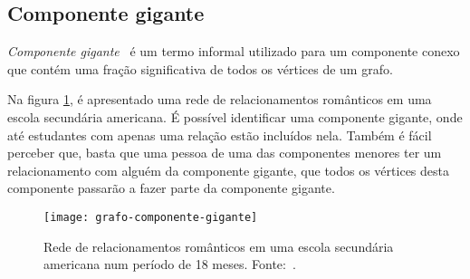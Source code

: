 \subsection{Componente gigante}
\label{conceitos__grafo--componente-gigante}

\emph{Componente gigante}~\cite{easley2010networks} é um termo informal utilizado para
um componente conexo que contém uma fração significativa de todos os vértices de um grafo.

Na figura \ref{fig:grafo-componente-gigante}, é apresentado uma rede de relacionamentos românticos em uma escola secundária americana. É possível identificar uma componente gigante, onde até estudantes com apenas uma relação estão incluídos nela. Também é fácil perceber que, basta que uma pessoa de uma das componentes menores ter um relacionamento com alguém da componente gigante, que todos os vértices desta componente passarão a fazer parte da componente gigante.

\begin{figure}[H]
\texttt{[image: grafo-componente-gigante]}
\centering
\caption{
    Rede de relacionamentos românticos em uma escola secundária americana num período de 18 meses. Fonte:~\cite{bearman2004chains}.
}
\label{fig:grafo-componente-gigante}
\end{figure}






